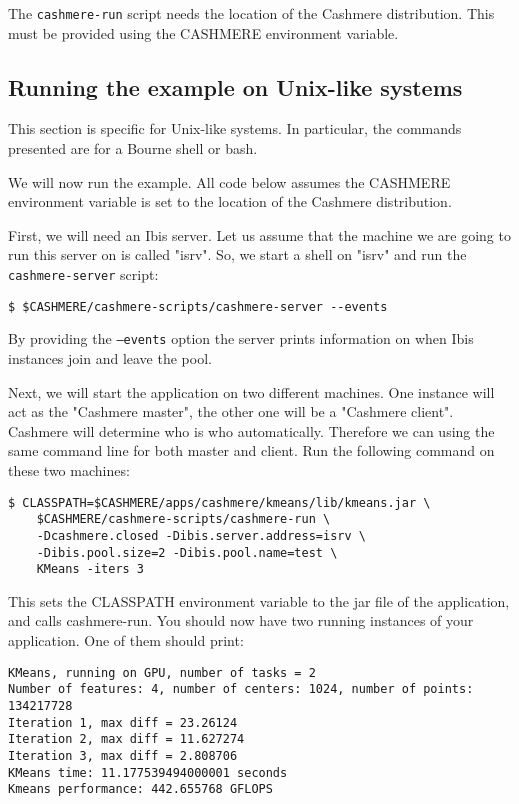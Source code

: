 \documentclass[a4paper,10pt]{article}
\begin{document}
The \texttt{cashmere-run} script needs the location of the Cashmere
distribution. This must be provided using the CASHMERE environment
variable.

\subsection{Running the example on Unix-like systems}

This section is specific for Unix-like systems. In particular, the
commands presented are for a Bourne shell or bash.

We will now run the example. All code below assumes the CASHMERE
environment variable is set to the location of the Cashmere distribution.

First, we will need an Ibis server.
Let us assume that the machine we are going to run this server on is called
"isrv". So, we start a shell on "isrv" and
run the \texttt{cashmere-server} script:
\noindent
{\small
\begin{verbatim}
$ $CASHMERE/cashmere-scripts/cashmere-server --events
\end{verbatim}
}
\noindent

By providing the \texttt{--events} option the server
prints information on when Ibis instances join and leave the pool.

Next, we will start the application on two different machines.
One instance will act as the
"Cashmere master", the other one will be a "Cashmere client".
Cashmere will determine who is who automatically.
Therefore we can using the same
command line for both master and client.
Run the following command on these two machines:

\noindent
{\small
\begin{verbatim}
$ CLASSPATH=$CASHMERE/apps/cashmere/kmeans/lib/kmeans.jar \
    $CASHMERE/cashmere-scripts/cashmere-run \
    -Dcashmere.closed -Dibis.server.address=isrv \
    -Dibis.pool.size=2 -Dibis.pool.name=test \
    KMeans -iters 3
\end{verbatim}
}
\noindent

This sets the CLASSPATH environment variable to the jar file of the
application, and calls cashmere-run. You should now have two running
instances of your application. One of them should print:

\noindent
{\small
\begin{verbatim}
KMeans, running on GPU, number of tasks = 2
Number of features: 4, number of centers: 1024, number of points: 134217728
Iteration 1, max diff = 23.26124
Iteration 2, max diff = 11.627274
Iteration 3, max diff = 2.808706
KMeans time: 11.177539494000001 seconds
Kmeans performance: 442.655768 GFLOPS
\end{verbatim}
}
\noindent
\end{document}
